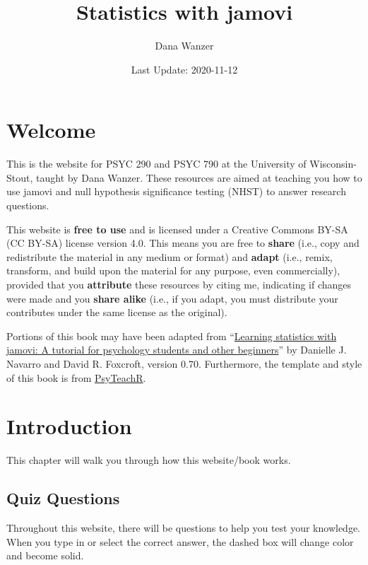\documentclass[
]{book}
\title{Statistics with jamovi}
\author{Dana Wanzer}
\date{Last Update: 2020-11-12}
\begin{document}
\maketitle

{
\setcounter{tocdepth}{1}
\tableofcontents
}
\hypertarget{welcome}{%
\chapter*{Welcome}\label{welcome}}

This is the website for PSYC 290 and PSYC 790 at the University of Wisconsin-Stout, taught by Dana Wanzer. These resources are aimed at teaching you how to use jamovi and null hypothesis significance testing (NHST) to answer research questions.

This website is \textbf{free to use} and is licensed under a Creative Commons BY-SA (CC BY-SA) license version 4.0. This means you are free to \textbf{share} (i.e., copy and redistribute the material in any medium or format) and \textbf{adapt} (i.e., remix, transform, and build upon the material for any purpose, even commercially), provided that you \textbf{attribute} these resources by citing me, indicating if changes were made and you \textbf{share alike} (i.e., if you adapt, you must distribute your contributes under the same license as the original).

Portions of this book may have been adapted from ``\href{http://www.learnstatswithjamovi.com}{Learning statistics with jamovi: A tutorial for psychology students and other beginners}'' by Danielle J. Navarro and David R. Foxcroft, version 0.70. Furthermore, the template and style of this book is from \href{https://psyteachr.github.io/book-template/setup.html}{PsyTeachR}.

\hypertarget{introduction}{%
\chapter{Introduction}\label{introduction}}

This chapter will walk you through how this website/book works.

\hypertarget{quiz-questions}{%
\section{Quiz Questions}\label{quiz-questions}}

Throughout this website, there will be questions to help you test your knowledge. When you type in or select the correct answer, the dashed box will change color and become solid.
\end{document}
